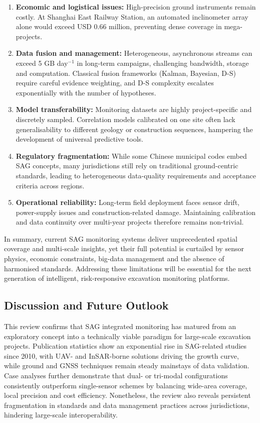 \documentclass[preprint,11pt,authoryear,3p]{elsarticle}
\begin{document}
\begin{enumerate}
    \item \textbf{Economic and logistical issues:} High-precision ground instruments remain costly. At Shanghai East Railway Station, an automated inclinometer array alone would exceed USD 0.66 million, preventing dense coverage in mega-projects.
    \item \textbf{Data fusion and management:} Heterogeneous, asynchronous streams can exceed 5 GB day$^{-1}$ in long-term campaigns, challenging bandwidth, storage and computation. Classical fusion frameworks (Kalman, Bayesian, D-S) require careful evidence weighting, and D-S complexity escalates exponentially with the number of hypotheses.
    \item \textbf{Model transferability:} Monitoring datasets are highly project-specific and discretely sampled. Correlation models calibrated on one site often lack generalisability to different geology or construction sequences, hampering the development of universal predictive tools.
    \item \textbf{Regulatory fragmentation:} While some Chinese municipal codes embed SAG concepts, many jurisdictions still rely on traditional ground-centric standards, leading to heterogeneous data-quality requirements and acceptance criteria across regions.
    \item \textbf{Operational reliability:} Long-term field deployment faces sensor drift, power-supply issues and construction-related damage. Maintaining calibration and data continuity over multi-year projects therefore remains non-trivial.
\end{enumerate}

In summary, current SAG monitoring systems deliver unprecedented spatial coverage and multi-scale insights, yet their full potential is curtailed by sensor physics, economic constraints, big-data management and the absence of harmonised standards. Addressing these limitations will be essential for the next generation of intelligent, risk-responsive excavation monitoring platforms.

\subsection{Discussion and Future Outlook}

This review confirms that SAG integrated monitoring has matured from an exploratory concept into a technically viable paradigm for large-scale excavation projects. Publication statistics show an exponential rise in SAG-related studies since 2010, with UAV- and InSAR-borne solutions driving the growth curve, while ground and GNSS techniques remain steady mainstays of data validation.  Case analyses further demonstrate that dual- or tri-modal configurations consistently outperform single-sensor schemes by balancing wide-area coverage, local precision and cost efficiency.  Nonetheless, the review also reveals persistent fragmentation in standards and data management practices across jurisdictions, hindering large-scale interoperability.
\end{document}

